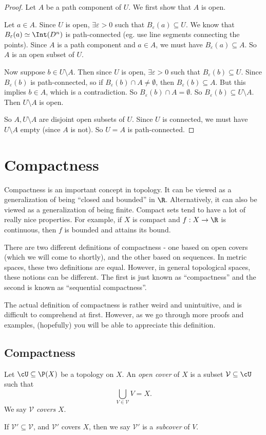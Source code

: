 \documentclass[a4paper]{article}
\begin{document}
\begin{proof}
  Let $A$ be a path component of $U$. We first show that $A$ is open.

  Let $a\in A$. Since $U$ is open, $\exists \varepsilon > 0$ such that $B_\varepsilon(a) \subseteq U$. We know that $B_\varepsilon(a) \simeq \Int(D^n)$ is path-connected (eg. use line segments connecting the points). Since $A$ is a path component and $a\in A$, we must have $B_\varepsilon(a) \subseteq A$. So $A$ is an open subset of $U$.

  Now suppose $b\in U\setminus A$. Then since $U$ is open, $\exists \varepsilon > 0$ such that $B_\varepsilon(b) \subseteq U$. Since $B_\varepsilon(b)$ is path-connected, so if $B_\varepsilon(b) \cap A \not= \emptyset$, then $B_\varepsilon(b)\subseteq A$. But this implies $b\in A$, which is a contradiction. So $B_\varepsilon(b) \cap A = \emptyset$. So $B_\varepsilon(b) \subseteq U\setminus A$. Then $U\setminus A$ is open.

  So $A, U\setminus A$ are disjoint open subsets of $U$. Since $U$ is connected, we must have $U\setminus A$ empty (since $A$ is not). So $U = A$ is path-connected.
\end{proof}

\section{Compactness}
Compactness is an important concept in topology. It can be viewed as a generalization of being ``closed and bounded'' in $\R$. Alternatively, it can also be viewed as a generalization of being finite. Compact sets tend to have a lot of really nice properties. For example, if $X$ is compact and $f: X \to \R$ is continuous, then $f$ is bounded and attains its bound.

There are two different definitions of compactness - one based on open covers (which we will come to shortly), and the other based on sequences. In metric spaces, these two definitions are equal. However, in general topological spaces, these notions can be different. The first is just known as ``compactness'' and the second is known as ``sequential compactness''.

The actual definition of compactness is rather weird and unintuitive, and is difficult to comprehend at first. However, as we go through more proofs and examples, (hopefully) you will be able to appreciate this definition.

\subsection{Compactness}
\begin{defi}
  Let $\cU\subseteq \P(X)$ be a topology on $X$. An \emph{open cover} of $X$ is a subset $\mathcal{V}\subseteq \cU$ such that
  \[
    \bigcup_{V\in \mathcal{V}} V = X.
  \]
  We say $\mathcal{V}$ \emph{covers} $X$.

  If $\mathcal{V}'\subseteq \mathcal{V}$, and $\mathcal{V}'$ covers $X$, then we say $\mathcal{V}'$ is a \emph{subcover} of $V$.
\end{defi}
\end{document}
